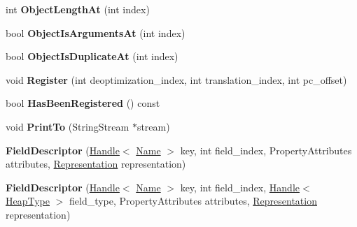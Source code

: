 \begin{DoxyCompactItemize}
\item 
\hypertarget{classv8_1_1internal_1_1_v8___f_i_n_a_l_a8f604b5d3730184d1ff34aedc2cfc971}{}int {\bfseries Object\+Length\+At} (int index)\label{classv8_1_1internal_1_1_v8___f_i_n_a_l_a8f604b5d3730184d1ff34aedc2cfc971}

\item 
\hypertarget{classv8_1_1internal_1_1_v8___f_i_n_a_l_a1c21a357a61b32f4e64b3086f6d36c4a}{}bool {\bfseries Object\+Is\+Arguments\+At} (int index)\label{classv8_1_1internal_1_1_v8___f_i_n_a_l_a1c21a357a61b32f4e64b3086f6d36c4a}

\item 
\hypertarget{classv8_1_1internal_1_1_v8___f_i_n_a_l_a6206a602dd762e13220052cff6d80bda}{}bool {\bfseries Object\+Is\+Duplicate\+At} (int index)\label{classv8_1_1internal_1_1_v8___f_i_n_a_l_a6206a602dd762e13220052cff6d80bda}

\item 
\hypertarget{classv8_1_1internal_1_1_v8___f_i_n_a_l_a2fd8c6553239f63db75cbd35a889d218}{}void {\bfseries Register} (int deoptimization\+\_\+index, int translation\+\_\+index, int pc\+\_\+offset)\label{classv8_1_1internal_1_1_v8___f_i_n_a_l_a2fd8c6553239f63db75cbd35a889d218}

\item 
\hypertarget{classv8_1_1internal_1_1_v8___f_i_n_a_l_aec9e3349265230a7e0b0c229073b6d01}{}bool {\bfseries Has\+Been\+Registered} () const \label{classv8_1_1internal_1_1_v8___f_i_n_a_l_aec9e3349265230a7e0b0c229073b6d01}

\item 
\hypertarget{classv8_1_1internal_1_1_v8___f_i_n_a_l_aac605080a924e4a0fbe764c5a5d1c39d}{}void {\bfseries Print\+To} (String\+Stream $\ast$stream)\label{classv8_1_1internal_1_1_v8___f_i_n_a_l_aac605080a924e4a0fbe764c5a5d1c39d}

\item 
\hypertarget{classv8_1_1internal_1_1_v8___f_i_n_a_l_ae54037b39a2b3e9553ce6451c957fc83}{}{\bfseries Field\+Descriptor} (\hyperlink{classv8_1_1internal_1_1_handle}{Handle}$<$ \hyperlink{classv8_1_1internal_1_1_name}{Name} $>$ key, int field\+\_\+index, Property\+Attributes attributes, \hyperlink{classv8_1_1internal_1_1_representation}{Representation} representation)\label{classv8_1_1internal_1_1_v8___f_i_n_a_l_ae54037b39a2b3e9553ce6451c957fc83}

\item 
\hypertarget{classv8_1_1internal_1_1_v8___f_i_n_a_l_a9a0f3f3fb55a43ffd696ff4dfb4868c3}{}{\bfseries Field\+Descriptor} (\hyperlink{classv8_1_1internal_1_1_handle}{Handle}$<$ \hyperlink{classv8_1_1internal_1_1_name}{Name} $>$ key, int field\+\_\+index, \hyperlink{classv8_1_1internal_1_1_handle}{Handle}$<$ \hyperlink{classv8_1_1internal_1_1_type_impl}{Heap\+Type} $>$ field\+\_\+type, Property\+Attributes attributes, \hyperlink{classv8_1_1internal_1_1_representation}{Representation} representation)\label{classv8_1_1internal_1_1_v8___f_i_n_a_l_a9a0f3f3fb55a43ffd696ff4dfb4868c3}


\end{DoxyCompactItemize}
